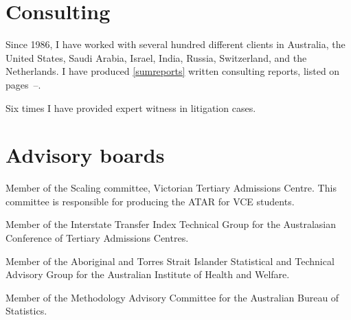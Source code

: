 \documentclass[a4paper,10pt]{article}
\begin{document}
\section{Consulting}

\begin{compactitem}\itemsep=0.1cm
\item Since 1986, I have worked with several hundred different clients in Australia, the United States, Saudi Arabia, Israel, India, Russia, Switzerland, and the Netherlands. I have produced \ref{sumreports} written consulting reports, listed on pages~\pageref{consulting}--\pageref{sumreports}.

\item Six times I have provided expert witness in litigation cases.
\end{compactitem}

\section{Advisory boards}

\begin{compactitem}
\item Member of the Scaling committee, Victorian Tertiary Admissions Centre. This committee is responsible for producing the ATAR for VCE students.
\item Member of the Interstate Transfer Index Technical Group for the Australasian Conference of Tertiary Admissions Centres.
\item Member of the Aboriginal and Torres Strait Islander Statistical and Technical Advisory Group for the Australian Institute of Health and Welfare.
\item Member of the Methodology Advisory Committee for the Australian Bureau of Statistics.
\end{compactitem}


\newpage
\setlength{\bibitemsep}{1.8pt}

\begin{publications}
\end{publications}


\setcounter{sumpapers}{0}
\label{consulting}
\printbibliography[heading=reports,type=report,keyword=consulting]%
\addtocounter{sumpapers}{-1}%
\label{sumreports}

\setcounter{sumpapers}{0}
\newrefcontext[sorting=ty]
\printbibliography[category=software,heading=software]
\addtocounter{sumpapers}{-1}
\label{sumsoftware}
\end{document}
